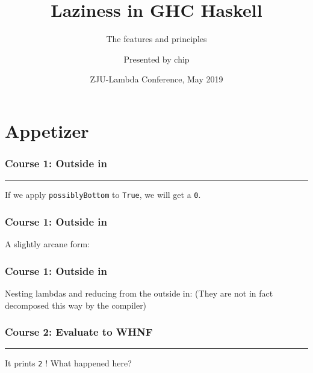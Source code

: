 \documentclass{beamer}
\title[Laziness in GHC Haskell]
{Laziness in GHC Haskell}
\subtitle{The features and principles}
\author[chip]
{Presented by chip}
\institute[ZJU]
{
  ZJU Lambda\\
  From here to World
}
\date[ZJU-Lambda 2019]
{ZJU-Lambda Conference, May 2019}
\begin{document}
\frame{\titlepage}


\section{Appetizer}

\begin{frame}
\frametitle{Course 1: Outside in}

\par\noindent\rule{0.75\textwidth}{1.0pt}
\newline\newline
If we apply \texttt{possiblyBottom} to \texttt{True}, we will get a \texttt{0}.

\end{frame}


\begin{frame}
\frametitle{Course 1: Outside in}

A slightly arcane form:\newline
{}

\end{frame}


\begin{frame}
\frametitle{Course 1: Outside in}

Nesting lambdas and reducing from the outside in:\newline
(They are not in fact decomposed this way by the compiler)\newline
{}

\end{frame}


\begin{frame}
\frametitle{Course 2: Evaluate to WHNF}

\par\noindent\rule{0.7\textwidth}{1.0pt}
\newline\newline
It prints \texttt{2} !
\newline
What happened here?

\end{frame}
\end{document}
